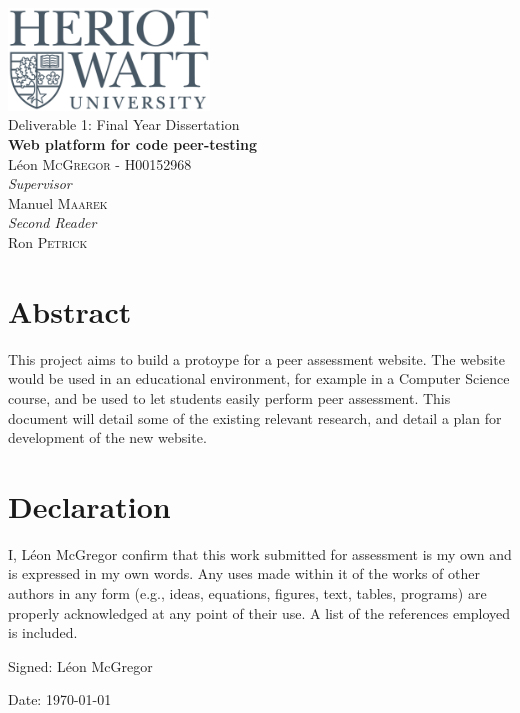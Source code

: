 \documentclass[a4paper,11pt]{report}
\newcommand{\titles}{\\\vspace{1cm}}
\begin{document}
{\centering\Large
\includegraphics[width=0.4\textwidth]{../hwu.png}\titles
Deliverable 1: Final Year Dissertation\titles
{\huge\bfseries Web platform for code peer-testing\titles}
L\'eon \textsc{McGregor} - H00152968\titles
{\large\textit{Supervisor}\\}
Manuel \textsc{Maarek}\titles
{\large\textit{Second Reader}\\}
Ron \textsc{Petrick}\\
\vfill
}

\pagebreak

\tableofcontents


\pagebreak
\doublespacing


\section*{Abstract}
This project aims to build a protoype for a peer assessment website. The website would be used in an educational environment, for example in a Computer Science course, and be used to let students easily perform peer assessment. This document will detail some of the existing relevant research, and detail a plan for development of the new website.

\vfill

\section*{Declaration}
I, L\'eon McGregor confirm that this work submitted for assessment is my own and is expressed in my own words. Any uses made within it of the works of other authors in any form (e.g., ideas, equations, figures, text, tables, programs) are properly acknowledged at any point of their use. A list of the references employed is included.\par
Signed: L\'eon McGregor\par
Date: \today

\pagebreak

\pagestyle{headings}
\end{document}
